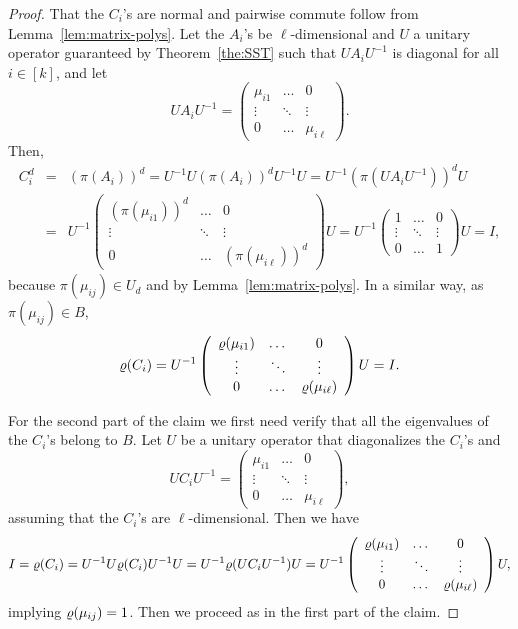 \begin{proof}
That the $C_i$'s are normal and pairwise commute follow from Lemma~\ref{lem:matrix-polys}. Let the $A_i$'s be $\ell$-dimensional and $U$ a unitary operator guaranteed by Theorem~\ref{the:SST} such that $UA_iU^{-1}$ is diagonal for all $i\in[k]$, and let 
\[
UA_iU^{-1}=\left(\begin{array}{ccc}\mu_{i1}&\dots&0\\ \vdots&\ddots&\vdots\\ 0&\dots&\mu_{i\ell} \end{array}\right).
\]
%
Then,
\begin{eqnarray*}
C_i^d &=& (\pi(A_i))^d=U^{-1}U(\pi(A_i))^dU^{-1}U=U^{-1}(\pi(UA_iU^{-1}))^dU\\
&=& U^{-1}\left(\begin{array}{ccc}(\pi(\mu_{i1}))^d&\dots&0\\ \vdots&\ddots&\vdots\\ 0&\dots&(\pi(\mu_{i\ell}))^d \end{array}\right)U = U^{-1}\left(\begin{array}{ccc}1&\dots&0\\ \vdots&\ddots&\vdots\\ 0&\dots&1 \end{array}\right)U=I,
\end{eqnarray*}
 because $\pi(\mu_{ij})\in U_d$ and by Lemma~\ref{lem:matrix-polys}. In a similar way, as $\pi(\mu_{ij})\in B$,
 \[
 \varrho(C_i)= U^{-1}\left(\begin{array}{ccc}\varrho(\mu_{i1})&\dots&0\\ \vdots&\ddots&\vdots\\ 0&\dots&\varrho(\mu_{i\ell}) \end{array}\right)U=I.
 \]

For the second part of the claim we first need verify that all the eigenvalues of the $C_i$'s belong to $B$. Let $U$ be a unitary operator that diagonalizes the $C_i$'s and 
\[
UC_iU^{-1}=\left(\begin{array}{ccc}\mu_{i1}&\dots&0\\ \vdots&\ddots&\vdots\\ 0&\dots&\mu_{i\ell} \end{array}\right),
\]
assuming that the $C_i$'s are $\ell$-dimensional.  Then we have
\[
  I = \varrho(C_i) = U^{-1}U\varrho(C_i)U^{-1}U = U^{-1}\varrho(UC_iU^{-1})U = U^{-1}\left(\begin{array}{ccc}\varrho(\mu_{i1})&\dots&0\\ \vdots&\ddots&\vdots\\ 0&\dots&\varrho(\mu_{i\ell}) \end{array}\right)U,
\]
implying $\varrho(\mu_{ij})=1$. Then we proceed as in the first part of the claim.
\end{proof}

